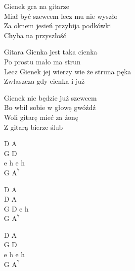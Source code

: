 \begin{text}
    Gienek gra na gitarze\\
    Miał być szewcem lecz mu nie wyszło\\
    Za oknem jesień przybija podkówki\\
    Chyba na przyszłość

    \vin Gitara Gienka jest taka cienka\\
    \vin Po prostu mało ma strun\\
    \vin Lecz Gienek jej wierzy wie że struna pęka\\
    \vin Zwłaszcza gdy cienka i już

    Gienek nie będzie już szewcem\\
    Bo wbił sobie w głowę gwóźdź\\
    Woli gitarę mieć za żonę\\
    Z gitarą bierze ślub
\end{text}
\begin{chord}
    D A\\
    G D\\
    e h e h\\
    G $\mathrm{A^7}$

    D A\\
    D A\\
    G D e h\\
    G $\mathrm{A^7}$

    D A\\
    G D\\
    e h e h\\
    G $\mathrm{A^7}$
\end{chord}
